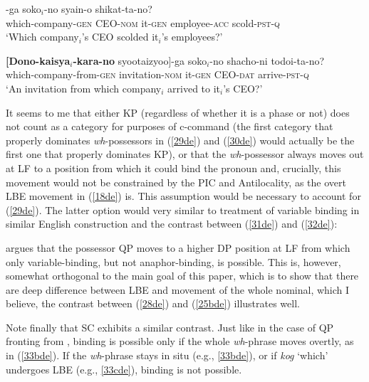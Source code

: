 \documentclass[output=paper]{langscibook}
\begin{document}
\begin{exe}
\ex \label{29de}
-ga soko$_{i}$-no syain-o shikat-ta-no?\\
which-company-\textsc{gen} CEO-\textsc{nom} it-\textsc{gen} employee-\textsc{acc} scold-\textsc{pst}-\textsc{q}\\
\glt ‘Which company$_{i}$’s CEO scolded it$_{i}$’s employees?’ 

\ex \label{30de}
\gll \textbf{[Dono-kaisya$_{i}$-kara-no}       syootaizyoo]-ga soko$_{i}$-no shacho-ni todoi-ta-no?\\
which-company-from-\textsc{gen} invitation-\textsc{nom} it-\textsc{gen} CEO-\textsc{dat} arrive-\textsc{pst}-\textsc{q}\\
\glt ‘An invitation from which company$_{i}$ arrived to it$_{i}$’s CEO?’ 
\end{exe}

It seems to me that either KP (regardless of whether it is a phase or not) does not count as a category for purposes of c-command (the first category that properly dominates \textit{wh}-possessors in (\ref{29de}) and (\ref{30de}) would actually be the first one that properly dominates KP), or that the \textit{wh}-possessor always moves out at LF to a position from which it could bind the pronoun and, crucially, this movement would not be constrained by the PIC and Antilocality, as the overt LBE movement in (\ref{18de}) is. This assumption would be necessary to account for (\ref{29de}). The latter option would very similar to  treatment of variable binding in similar English construction and the contrast between (\ref{31de}) and (\ref{32de}):

\begin{exe}

\end{exe}

\citet{Kayne1994} argues that the possessor QP moves to a higher DP position at LF from which only variable-binding, but not anaphor-binding, is possible. This is, however, somewhat orthogonal to the main goal of this paper, which is to show that there are deep difference between LBE and movement of the whole nominal, which I believe, the contrast between (\ref{28de}) and (\ref{25bde}) illustrates well. 

Note finally that SC exhibits a similar contrast. Just like in the case of QP fronting from , binding is possible only if the whole \textit{wh}-phrase moves overtly, as in (\ref{33bde}). If the \textit{wh}-phrase stays in situ (e.g., \ref{33bde}), or if \textit{kog} ‘which’ undergoes LBE (e.g., \ref{33cde}), binding is not possible.
\end{document}
